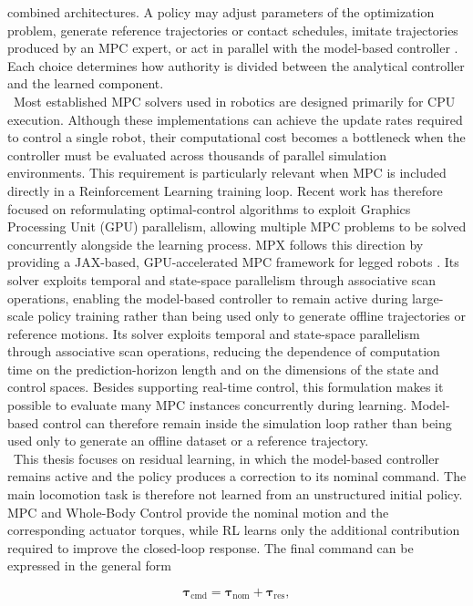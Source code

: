 combined architectures. A policy may adjust parameters of the optimization
problem, generate reference trajectories or contact schedules, imitate
trajectories produced by an MPC expert, or act in parallel with the model-based
controller \cite{adaptive_mpc,non_gaited}. Each choice
determines how authority is divided between the analytical controller and the
learned component.\\
\
Most established MPC solvers used in robotics are designed primarily for CPU
execution. Although these implementations can achieve the update rates required
to control a single robot, their computational cost becomes a bottleneck when
the controller must be evaluated across thousands of parallel simulation
environments. This requirement is particularly relevant when MPC is included
directly in a Reinforcement Learning training loop. Recent work has therefore
focused on reformulating optimal-control algorithms to exploit Graphics Processing
Unit (GPU) parallelism,
allowing multiple MPC problems to be solved concurrently alongside the learning
process. MPX follows this direction by providing a JAX-based, GPU-accelerated
MPC framework for legged robots \cite{mpx}. Its solver exploits temporal and
state-space parallelism through associative scan operations, enabling the
model-based controller to remain active during large-scale policy training
rather than being used only to generate offline trajectories or reference
motions. Its solver exploits temporal and
state-space parallelism through associative scan operations, reducing the
dependence of computation time on the prediction-horizon length and on the
dimensions of the state and control spaces. Besides supporting real-time
control, this formulation makes it possible to evaluate many MPC instances
concurrently during learning. Model-based control can therefore remain inside
the simulation loop rather than being used only to generate an offline dataset
or a reference trajectory.\\
\
This thesis focuses on residual learning, in which the model-based controller
remains active and the policy produces a correction to its nominal command. The
main locomotion task is therefore not learned from an unstructured initial
policy. MPC and Whole-Body Control provide the nominal motion and the
corresponding actuator torques, while RL learns only the additional contribution
required to improve the closed-loop response. The final command can be
expressed in the general form

$$
\boldsymbol{\tau}_{\mathrm{cmd}}
=
\boldsymbol{\tau}_{\mathrm{nom}}
+
\boldsymbol{\tau}_{\mathrm{res}},
$$

